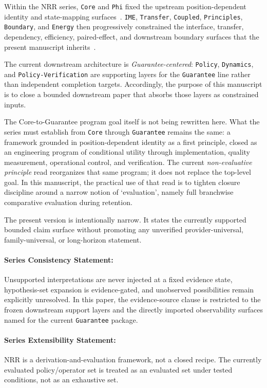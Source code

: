 \documentclass[11pt]{article}
\begin{document}
Within the NRR series, \texttt{Core} and \texttt{Phi} fixed the upstream
position-dependent identity and state-mapping surfaces~\cite{saito2025nrr,saito2026phi}.
\texttt{IME}, \texttt{Transfer}, \texttt{Coupled}, \texttt{Principles},
\texttt{Boundary}, and \texttt{Energy} then progressively constrained the
interface, transfer, dependency, efficiency, paired-effect, and downstream
boundary surfaces that the present manuscript inherits~\cite{saito2026ime,saito2026transfer,saito2026coupled,saito2026principles,saito2026boundary,saito2026energy}.

The current downstream architecture is \textit{Guarantee-centered}: \texttt{Policy},
\texttt{Dynamics}, and \texttt{Policy-Verification} are supporting layers for the
\texttt{Guarantee} line rather than independent completion targets. Accordingly, the
purpose of this manuscript is to close a bounded downstream paper that absorbs those
layers as constrained inputs.

The Core-to-Guarantee program goal itself is not being rewritten here. What the
series must establish from \texttt{Core} through \texttt{Guarantee} remains the
same: a framework grounded in position-dependent identity as a first principle,
closed as an engineering program of conditional utility through
implementation, quality measurement, operational control, and verification. The
current \textit{non-evaluative principle} read reorganizes that same program; it
does not replace the top-level goal. In this manuscript, the practical use of
that read is to tighten closure discipline around a narrow notion of
`evaluation', namely full branchwise comparative evaluation during retention.

The present version is intentionally narrow. It states the currently supported
bounded claim surface without promoting any unverified provider-universal,
family-universal, or long-horizon statement.

\paragraph{Series Consistency Statement:}
Unsupported interpretations are never injected at a fixed evidence state,
hypothesis-set expansion is evidence-gated, and unobserved possibilities remain
explicitly unresolved. In this paper, the evidence-source clause is restricted to
the frozen downstream support layers and the directly imported observability
surfaces named for the current \texttt{Guarantee} package.

\paragraph{Series Extensibility Statement:}
NRR is a derivation-and-evaluation framework, not a closed recipe. The currently
evaluated policy/operator set is treated as an evaluated set under tested
conditions, not as an exhaustive set.
\end{document}
